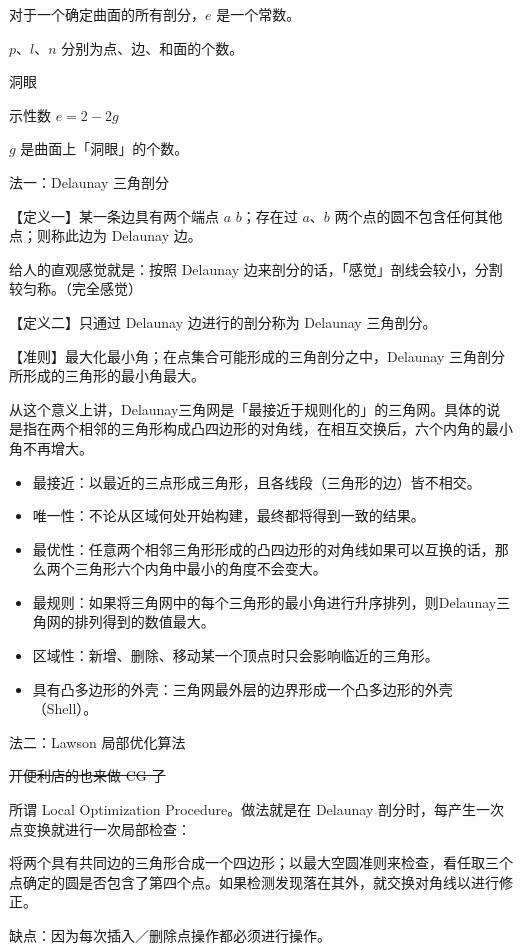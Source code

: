 \documentclass[
]{article}
\begin{document}
对于一个确定曲面的所有剖分，\(e\) 是一个常数。

\(p\)、\(l\)、\(n\) 分别为点、边、和面的个数。

洞眼

示性数 \(e = 2 - 2g\)

\(g\) 是曲面上「洞眼」的个数。

法一：Delaunay 三角剖分

【定义一】某一条边具有两个端点 \(a\) \(b\)；存在过 \(a\)、\(b\)
两个点的圆不包含任何其他点；则称此边为 Delaunay 边。

给人的直观感觉就是：按照 Delaunay
边来剖分的话，「感觉」剖线会较小，分割较匀称。（完全感觉）

【定义二】只通过 Delaunay 边进行的剖分称为 Delaunay 三角剖分。

【准则】最大化最小角；在点集合可能形成的三角剖分之中，Delaunay
三角剖分所形成的三角形的最小角最大。

从这个意义上讲，Delaunay三角网是「最接近于规则化的」的三角网。具体的说是指在两个相邻的三角形构成凸四边形的对角线，在相互交换后，六个内角的最小角不再增大。

\begin{itemize}
\item
  最接近：以最近的三点形成三角形，且各线段（三角形的边）皆不相交。
\item
  唯一性：不论从区域何处开始构建，最终都将得到一致的结果。
\item
  最优性：任意两个相邻三角形形成的凸四边形的对角线如果可以互换的话，那么两个三角形六个内角中最小的角度不会变大。
\item
  最规则：如果将三角网中的每个三角形的最小角进行升序排列，则Delaunay三角网的排列得到的数值最大。
\item
  区域性：新增、删除、移动某一个顶点时只会影响临近的三角形。
\item
  具有凸多边形的外壳：三角网最外层的边界形成一个凸多边形的外壳（Shell）。
\end{itemize}

法二：Lawson 局部优化算法

\sout{开便利店的也来做 CG 了}

所谓 Local Optimization Procedure。做法就是在 Delaunay
剖分时，每产生一次点变换就进行一次局部检查：

将两个具有共同边的三角形合成一个四边形；以最大空圆准则来检查，看任取三个点确定的圆是否包含了第四个点。如果检测发现落在其外，就交换对角线以进行修正。

缺点：因为每次插入／删除点操作都必须进行操作。
\end{document}
